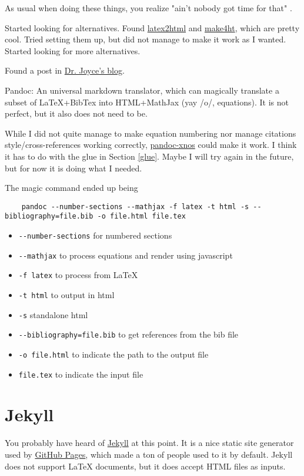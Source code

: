 \documentclass{article}
\begin{document}
As usual when doing these things, you realize "ain't nobody got time for that" \cite{AINT_GOT_TIME}.

Started looking for alternatives.
Found \href{https://github.com/latex2html/latex2html}{latex2html} and
\href{https://github.com/michal-h21/make4ht}{make4ht}, which are pretty cool.
Tried setting them up, but did not manage to make it work as I wanted.
Started looking for more alternatives.

Found a post in \href{https://www.danwjoyce.com/data-blog/2018/2/20/latex-to-html-via-pandoc}{Dr. Joyce's blog}.

Pandoc: An universal markdown translator, which can magically translate a subset of LaTeX+BibTex into HTML+MathJax
(yay /o/, equations).
It is not perfect, but it also does not need to be.

While I did not quite manage to make equation numbering nor manage citations style/cross-references working correctly,
\href{https://github.com/tomduck/pandoc-xnos}{pandoc-xnos} could make it work.
I think it has to do with the glue in Section \ref{glue}.
Maybe I will try again in the future, but for now it is doing what I needed.

The magic command ended up being
\begin{verbatim}
    pandoc --number-sections --mathjax -f latex -t html -s --bibliography=file.bib -o file.html file.tex
\end{verbatim}

\begin{itemize}
    \item \lstinline{--number-sections} for numbered sections
    \item \lstinline{--mathjax} to process equations and render using javascript
    \item \lstinline{-f latex} to process from LaTeX
    \item \lstinline{-t html} to output in html
    \item \lstinline{-s} standalone html
    \item \lstinline{--bibliography=file.bib} to get references from the bib file
    \item \lstinline{-o file.html} to indicate the path to the output file
    \item \lstinline{file.tex} to indicate the input file
\end{itemize}

\section{Jekyll} \label{Jekyll}
You probably have heard of \href{https://jekyllrb.com/}{Jekyll} at this point.
It is a nice static site generator used by \href{https://pages.github.com/}{GitHub Pages}, which made a ton of people used to it by default.
Jekyll does not support LaTeX documents, but it does accept HTML files as inputs.
\end{document}
